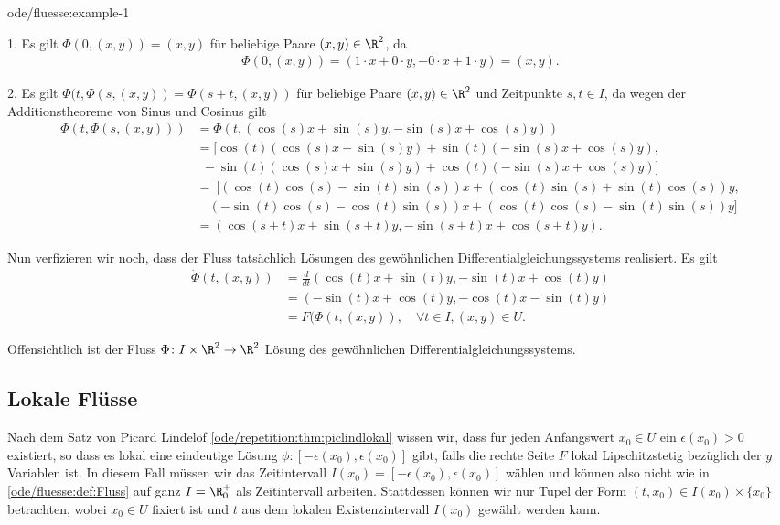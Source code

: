 \documentclass[letterpaper,10pt,german]{jupyterBook}
\begin{document}
\begin{example}{}{ode/fluesse:example-1}
\par
1. Es gilt \(\Phi(0, (x,y)) = (x,y)\) für beliebige Paare \((x,y) \in \R^2\), da
\begin{align*}
\Phi(0, (x,y)) = (1\cdot x + 0\cdot y, - 0 \cdot x + 1 \cdot y) = (x,y).
\end{align*}
\par
2. Es gilt \(\Phi(t, \Phi(s,(x,y)) = \Phi(s + t, (x,y))\) für beliebige Paare \((x,y) \in \R^2\) und Zeitpunkte \(s,t \in I\), da wegen der Additionstheoreme von Sinus und Cosinus gilt
\begin{align*}
\Phi(t, \Phi(s,(x,y))) &= \Phi(t, (\cos(s)x + \sin(s)y, -\sin(s)x + \cos(s)y)) \\
&= [\cos(t)(\cos(s)x + \sin(s)y) + \sin(t)(-\sin(s)x + \cos(s)y), \\
& \ \ -\sin(t)(\cos(s)x + \sin(s)y) + \cos(t)(-\sin(s)x + \cos(s)y)]\\
&= \ [ (\cos(t)\cos(s) - \sin(t)\sin(s))x + (\cos(t)\sin(s) + \sin(t)\cos(s))y, \\
& \quad (-\sin(t)\cos(s) - \cos(t)\sin(s))x + (\cos(t)\cos(s) - \sin(t)\sin(s))y ] \\
&= (\cos(s+t)x + \sin(s+t)y, -\sin(s+t)x + \cos(s+t)y).
\end{align*}
\par
Nun verfizieren wir noch, dass der Fluss tatsächlich Lösungen des gewöhnlichen Differentialgleichungssystems realisiert.
Es gilt
\begin{align*}
\dot{\Phi}(t, (x,y)) &= \frac{d}{dt}(\cos(t)x + \sin(t)y, -\sin(t)x + \cos(t)y) 
\\&=
(-\sin(t)x + \cos(t)y, -\cos(t)x - \sin(t)y) 
\\&= 
F(\Phi(t,(x,y)), \quad \forall t \in I, (x,y) \in U.
\end{align*}
\par
Offensichtlich ist der Fluss \(\Phi \colon I \times \R^2 \rightarrow \R^2\) Lösung des gewöhnlichen Differentialgleichungssystems.
\end{example}


\subsection{Lokale Flüsse}
\label{\detokenize{ode/fluesse:lokale-flusse}}
\par
Nach dem Satz von Picard Lindelöf \cref{ode/repetition:thm:piclindlokal} wissen wir, dass für jeden Anfangswert \(x_0\in U\) ein \(\epsilon(x_0)>0\) existiert, so dass es lokal eine eindeutige Lösung \(\phi: [-\epsilon(x_0), \epsilon(x_0)]\) gibt, falls die rechte Seite \(F\) lokal Lipschitzstetig bezüglich der \(y\) Variablen ist.
In diesem Fall müssen wir das Zeitintervall \(I(x_0)=[-\epsilon(x_0), \epsilon(x_0)]\) wählen und können also nicht wie in \cref{ode/fluesse:def:Fluss} auf ganz \(I = \R^+_0\) als Zeitintervall arbeiten.
Stattdessen können wir nur Tupel der Form \((t, x_0) \in I(x_0) \times \{x_0\}\) betrachten, wobei \(x_0\in U\) fixiert ist und \(t\) aus dem lokalen Existenzintervall \(I(x_0)\) gewählt werden kann.
\end{document}
